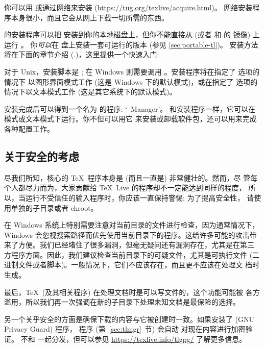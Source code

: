 \documentclass{article}
\begin{document}
你可以用 \DVD{} 或通过网络来安装 \TL{}
(\url{https://tug.org/texlive/acquire.html})。
网络安装程序本身很小，而且它会从网上下载一切所需的东西。

\DVD{} 的安装程序可以把 \TL{} 安装到你的本地磁盘上，但你不能直接从 \TK{}
\DVD{} (或者 \TK{} 和 \TL{} 的  镜像) 上运行 \TL{}。
你\emph{可以}在 \USB{} 盘上安装一套可运行的版本 (参见 \ref{sec:portable-tl})。
安装方法将在下面的章节介绍 (\p.\pageref{sec:install})，这里提供一个快速入门: 

\begin{itemize*}

\item 对于 Unix，安装脚本是 ; 在 Windows 则需要调用
。安装程序将在指定了  选项的情况下
以图形界面模式工作 (这是 Windows 下的默认模式)，或在指定了 
选项的情况下以文本模式工作 (这是其它系统下的默认模式)。

\item 安装完成后可以得到一个名为  的程序: `\TL\ Manager'。
和安装程序一样，它可以在 \GUI{} 模式或文本模式下运行。你不但可以用它
来安装或卸载软件包，还可以用来完成各种配置工作。

\end{itemize*}

\subsection{关于安全的考虑}
\label{sec:security}

尽我们所知，核心的 \TeX\ 程序本身是 (而且一直是) 非常健壮的。然而，尽
管每个人都尽力而为，大家贡献给 \TeX\ Live 的程序却不一定能达到同样的程度，
所以，当运行不受信任的输入程序时，你应该一直保持警惕; 为了提高安全性，
请使用单独的子目录或者 chroot。

在 Windows 系统上特别需要注意对当前目录的文件进行检查，因为通常情况下，
Windows 会忽视搜索路径而优先使用当前目录下的程序。这给许多可能的攻击带
来了方便。我们已经堵住了很多漏洞，但毫无疑问还有漏洞存在，尤其是在第三
方程序方面。因此，我们建议检查当前目录下的可疑文件，尤其是可执行文件
(二进制文件或者脚本)。一般情况下，它们不应该存在，而且更不应该在处理文
档时生成。

最后，\TeX\ (及其相关程序) 在处理文档时是可以写文件的，这个功能可能被
各方滥用，所以我们再一次强调在新的子目录下处理未知文档是最保险的选择。

另一个关乎安全的方面是确保下载的内容与它被创建时一致。如果安装了 
(GNU Privacy Guard) 程序， 程序 (第~\ref{sec:tlmgr}~节) 会自动
对现在内容进行加密验证。 不和 \TL{} 一起分发，但可以参见
\url{https://texlive.info/tlgpg/} 了解更多信息。
\end{document}

